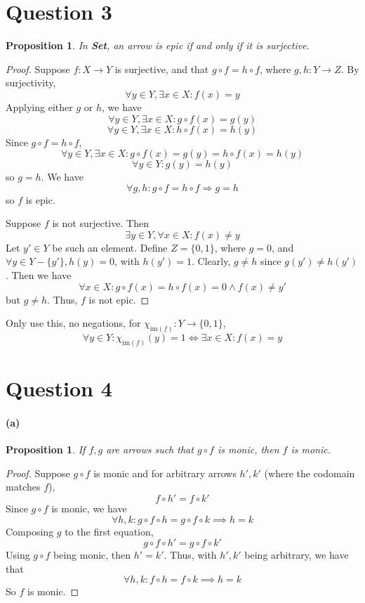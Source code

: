 \documentclass[11pt]{article} %
\newtheorem{proposition}[theorem]{Proposition}
\theoremstyle{definition}
\begin{document}
\section*{Question 3}
\addtocounter{section}{1}
\begin{proposition}
    In \textbf{Set}, an arrow is epic if and only if it is surjective.
\end{proposition}
\begin{proof}
    Suppose $f:X\rightarrow Y$ is surjective, and that $g\circ f=h\circ f$, where $g,h:Y\rightarrow Z$.
    By surjectivity,
    \[\forall y\in Y, \exists x\in X: f(x)=y\]
    Applying either $g$ or $h$, we have
    \[\forall y\in Y, \exists x\in X: g\circ f(x)=g(y)\]
    \[\forall y\in Y, \exists x\in X: h\circ f(x)=h(y)\]
    Since $g\circ f=h\circ f$,
    \[\forall y\in Y, \exists x\in X: g\circ f(x)=g(y)=h\circ f(x)=h(y)\]
    \[\forall y\in Y: g(y)=h(y)\]
    so $g=h$.
    We have 
    \[\forall g,h: g\circ f = h\circ f \Rightarrow g = h\]
    so $f$ is epic.

    Suppose $f$ is not surjective. Then
    \[\exists y\in Y,\forall x\in X: f(x)\neq y\]
    Let $y'\in Y$ be such an element.
    Define $Z=\{0,1\}$, where $g=0$, and $\forall y\in Y-\{y'\},h(y)=0$, with $h(y')=1$.
    Clearly, $g\neq h$ since $g(y')\neq h(y')$.
    Then we have
    \[\forall x\in X: g\circ f(x) = h\circ f(x)=0\wedge f(x)\neq y'\]
    but $g\neq h$.
    Thus, $f$ is not epic.

\end{proof}
{\color{teal}
Only use this, no negations, for $\chi_{\text{im}(f)}:Y\rightarrow \{0,1\}$,
\[\forall y\in Y:\chi_{\text{im}(f)}(y) = 1 \iff \exists x\in X: f(x) =y\]
}

\clearpage
\section*{Question 4}
\addtocounter{section}{1}
\paragraph{(a)}
\begin{proposition}
    If $f,g$ are arrows such that $g\circ f$ is monic, then $f$ is monic.
\end{proposition}
\begin{proof}
    Suppose $g\circ f$ is monic and for arbitrary arrows $h',k'$ (where the codomain matches $f$),
    \[f\circ h' = f\circ k'\]
    Since $g\circ f$ is monic, we have
    \[\forall h,k: g\circ f\circ h = g\circ f \circ k \implies h=k\]
    Composing $g$ to the first equation,
    \[g\circ f\circ h' = g\circ f\circ k'\]
    Using $g\circ f$ being monic, then $h'=k'$.
    Thus, with $h',k'$ being arbitrary, we have that
    \[\forall h,k:  f\circ h = f \circ k \implies h=k\]
    So $f$ is monic.
\end{proof}
\end{document}
